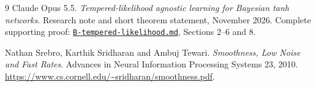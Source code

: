 \documentclass[11pt]{article}
\theoremstyle{definition}
\theoremstyle{remark}
\begin{document}
\begin{thebibliography}{9}
Claude Opus 5.5.
\emph{Tempered-likelihood agnostic learning for Bayesian tanh networks}.
Research note and short theorem statement, November 2026.
Complete supporting proof: \href{https://github.com/kaarelh/AI-works/blob/main/neural-network-generalization/works-in-progress/agnostic-learning/research-notes/B-tempered-likelihood.md}{\texttt{B-tempered-likelihood.md}}, Sections 2--6 and 8.

Nathan Srebro, Karthik Sridharan and Ambuj Tewari.
\emph{Smoothness, Low Noise and Fast Rates}.
Advances in Neural Information Processing Systems 23, 2010.
\url{https://www.cs.cornell.edu/~sridharan/smoothness.pdf}.
\end{thebibliography}
\end{document}
